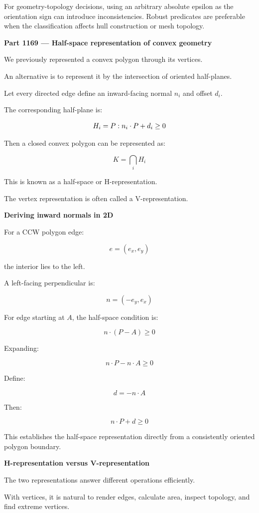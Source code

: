 For geometry-topology decisions, using an arbitrary absolute epsilon as the orientation sign can introduce inconsistencies. Robust predicates are preferable when the classification affects hull construction or mesh topology.

\textbf{Part 1169 --- Half-space representation of convex geometry}

We previously represented a convex polygon through its vertices.

An alternative is to represent it by the intersection of oriented half-planes.

Let every directed edge define an inward-facing normal \(n_i\) and offset \(d_i\).

The corresponding half-plane is:

\[
H_i=\\{P:n_i\cdot P+d_i\ge0\\}
\]

Then a closed convex polygon can be represented as:

\[
\boxed{ K=\bigcap_iH_i }
\]

This is known as a half-space or H-representation.

The vertex representation is often called a V-representation.

\textbf{Deriving inward normals in 2D}

For a CCW polygon edge:

\[
e=(e_x,e_y)
\]

the interior lies to the left.

A left-facing perpendicular is:

\[
\boxed{n=(-e_y,e_x)}
\]

For edge starting at \(A\), the half-space condition is:

\[
n\cdot(P-A)\ge0
\]

Expanding:

\[
n\cdot P-n\cdot A\ge0
\]

Define:

\[
d=-n\cdot A
\]

Then:

\[
n\cdot P+d\ge0
\]

This establishes the half-space representation directly from a consistently oriented polygon boundary.

\textbf{H-representation versus V-representation}

The two representations answer different operations efficiently.

With vertices, it is natural to render edges, calculate area, inspect topology, and find extreme vertices.

